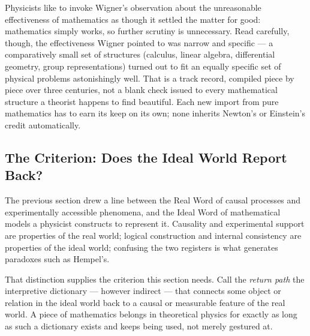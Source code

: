 Physicists like to invoke Wigner's observation about the unreasonable
effectiveness of mathematics as though it settled the matter for good:
mathematics simply works, so further scrutiny is unnecessary. Read carefully,
though, the effectiveness Wigner pointed to was narrow and specific --- a
comparatively small set of structures (calculus, linear algebra, differential
geometry, group representations) turned out to fit an equally specific set of
physical problems astonishingly well. That is a track record, compiled piece by
piece over three centuries, not a blank check issued to every mathematical
structure a theorist happens to find beautiful. Each new import from pure
mathematics has to earn its keep on its own; none inherits Newton's or
Einstein's credit automatically.

\subsection{The Criterion: Does the Ideal World Report Back?}

The previous section drew a line between the Real Word of causal processes and
experimentally accessible phenomena, and the Ideal Word of mathematical models
a physicist constructs to represent it. Causality and experimental support are
properties of the real world; logical construction and internal consistency are
properties of the ideal world; confusing the two registers is what generates
paradoxes such as Hempel's.

That distinction supplies the criterion this section needs. Call the
\emph{return path} the interpretive dictionary --- however indirect --- that
connects some object or relation in the ideal world back to a causal or
measurable feature of the real world. A piece of mathematics belongs in
theoretical physics for exactly as long as such a dictionary exists and keeps
being used, not merely gestured at.

\begin{center}
\end{center}

